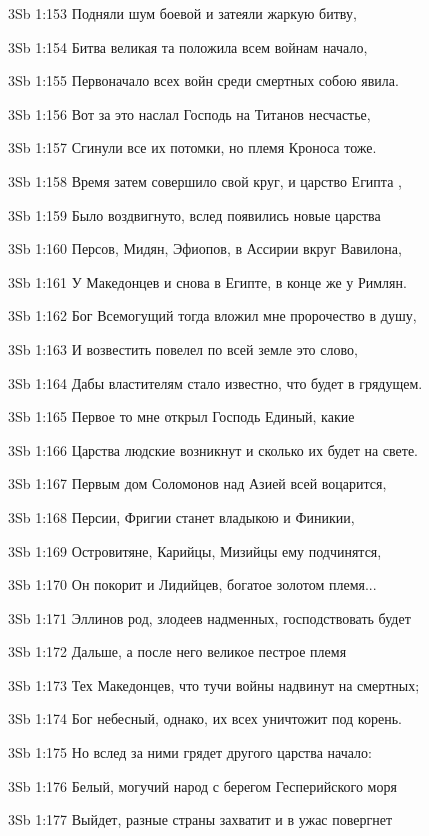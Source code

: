 \vs 3Sb 1:153 Подняли шум боевой и затеяли жаркую битву, 

\vs 3Sb 1:154 Битва великая та положила всем войнам начало,

\vs 3Sb 1:155 Первоначало всех войн среди смертных собою явила. 

\vs 3Sb 1:156 Вот за это наслал Господь на Титанов несчастье, 

\vs 3Sb 1:157 Сгинули все их потомки, но племя Кроноса  тоже. 

\vs 3Sb 1:158 Время затем совершило свой круг, и царство Египта , 

\vs 3Sb 1:159 Было воздвигнуто, вслед появились новые царства 

\vs 3Sb 1:160 Персов, Мидян, Эфиопов, в Ассирии вкруг Вавилона,

\vs 3Sb 1:161 У Македонцев и снова в Египте, в конце же  у Римлян. 

\vs 3Sb 1:162 Бог Всемогущий тогда вложил мне пророчество в душу, 

\vs 3Sb 1:163 И возвестить повелел по всей земле это слово, 

\vs 3Sb 1:164 Дабы властителям стало известно, что будет в грядущем.

\vs 3Sb 1:165 Первое то мне открыл Господь Единый, какие

\vs 3Sb 1:166 Царства людские возникнут и сколько их будет на свете. 

\vs 3Sb 1:167 Первым дом Соломонов над Азией всей воцарится, 

\vs 3Sb 1:168 Персии, Фригии станет владыкою и Финикии, 

\vs 3Sb 1:169 Островитяне, Карийцы, Мизийцы ему подчинятся,

\vs 3Sb 1:170 Он покорит и Лидийцев, богатое золотом племя... 

\vs 3Sb 1:171 Эллинов род, злодеев надменных, господствовать будет 

\vs 3Sb 1:172 Дальше, а после него  великое пестрое племя 

\vs 3Sb 1:173 Тех Македонцев, что тучи войны надвинут на смертных; 

\vs 3Sb 1:174 Бог небесный, однако, их всех уничтожит под корень.

\vs 3Sb 1:175 Но вслед за ними грядет другого царства начало: 

\vs 3Sb 1:176 Белый, могучий народ с берегом Гесперийского моря 

\vs 3Sb 1:177 Выйдет, разные страны захватит и в ужас повергнет 

